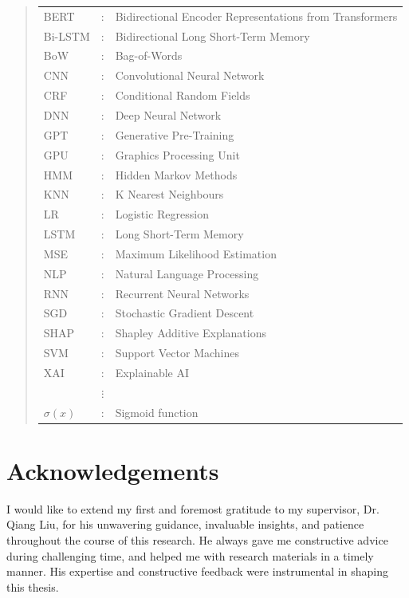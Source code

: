 \documentclass[ %
                    author={Bocheng Wang},
                supervisor={Dr. Qiang Liu},
                    degree={MSc},
                     title={A Research on Identification of Suicide Ideation in Texts with Multiple Models},
                      type={},
                      year={2024}]{dissertation}
\begin{document}
\begin{quote}
\noindent
\begin{tabular}{lcl}
      BERT    &: & Bidirectional Encoder Representations from Transformers \\
      Bi-LSTM &: & Bidirectional Long Short-Term Memory \\
      BoW     &: & Bag-of-Words \\
      CNN     &: & Convolutional Neural Network \\
      CRF     &: & Conditional Random Fields \\
      DNN     &: & Deep Neural Network \\
      GPT     &: & Generative Pre-Training \\
      GPU     &: & Graphics Processing Unit \\
      HMM     &: & Hidden Markov Methods \\
      KNN     &: & K Nearest Neighbours \\
      LR      &: & Logistic Regression \\
      LSTM    &: & Long Short-Term Memory \\
      MSE     &: & Maximum Likelihood Estimation \\
      NLP     &: & Natural Language Processing \\
      RNN     &: & Recurrent Neural Networks \\
      SGD     &: & Stochastic Gradient Descent \\
      SHAP    &: & Shapley Additive Explanations \\
      SVM     &: & Support Vector Machines \\
      XAI     &: & Explainable AI \\
              &$\vdots$ \\
      ${\sigma}( x )$ &: & Sigmoid function \\
\end{tabular}
\end{quote}


\chapter*{Acknowledgements}
\noindent
I would like to extend my first and foremost gratitude to my supervisor, Dr. Qiang Liu, for his unwavering guidance, invaluable insights, and patience throughout the course of this research. He always gave me constructive advice during challenging time, and helped me with research materials in a timely manner. His expertise and constructive feedback were instrumental in shaping this thesis.
\end{document}
